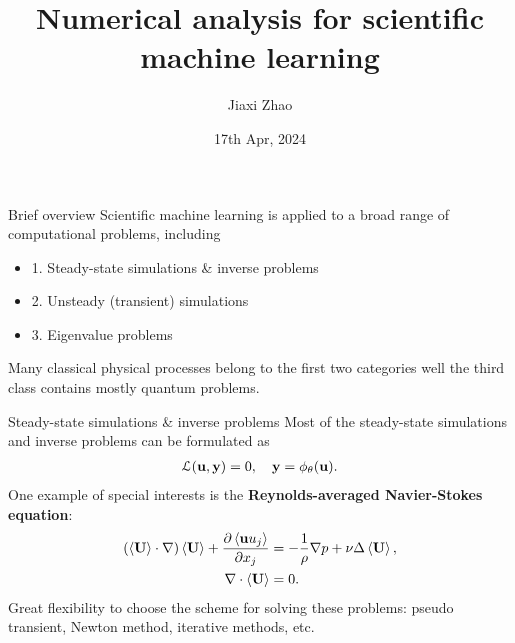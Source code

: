 \documentclass{beamer}
\title[SciML]{Numerical analysis for scientific machine learning}
\author[J. Zhao]{Jiaxi Zhao}
\date{17th Apr, 2024}
\begin{document}
\par \setlength{\parindent}{2em}

\begin{frame}
\titlepage

\end{frame}

\begin{frame}{Brief overview}
	Scientific machine learning is applied to a broad range of computational problems, including
	\begin{itemize}
		\item 1. Steady-state simulations \& inverse problems
		\item 2. Unsteady (transient) simulations
		\item 3. Eigenvalue problems
	\end{itemize}
	Many classical physical processes belong to the first two categories well the third class contains mostly quantum problems.
\end{frame}

\begin{frame}{Steady-state simulations \& inverse problems}
	Most of the steady-state simulations and inverse problems can be formulated as 
	\begin{equation*}
		\begin{aligned}
			\mathcal{L}(\mathbf{u}, \mathbf{y}) = 0, 	\quad \mathbf{y}= \phi_{\theta}(\mathbf{u}).
		\end{aligned}
	\end{equation*}
	One example of special interests is the \textbf{Reynolds-averaged Navier-Stokes equation}:
	\begin{equation*}
		\begin{aligned}
	(\left\langle \mathbf{U} \right\rangle \cdot \nabla)\left\langle \mathbf{U} \right\rangle + \frac{\partial \left\langle \mathbf{u} u_j \right\rangle}{\partial x_j} &= -\frac{1}{\rho}\nabla p + \nu \Delta \left\langle \mathbf{U} \right\rangle,		\\
	\nabla \cdot \left\langle \mathbf{U} \right\rangle &= 0.
	\end{aligned}
	\end{equation*}
	Great flexibility to choose the scheme for solving these problems: pseudo transient, Newton method,
	iterative methods, etc.
\end{frame}
\end{document}
